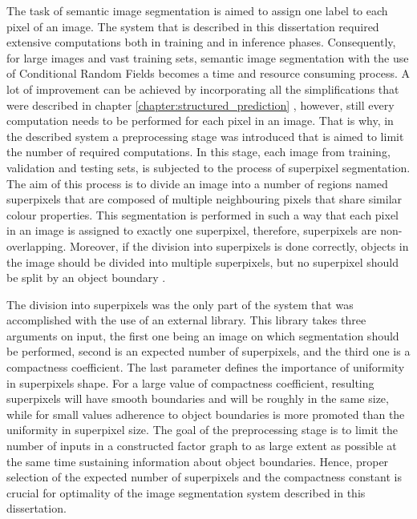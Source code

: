 The task of semantic image segmentation is aimed to assign one label to each pixel of an image. The system that is described in this dissertation required extensive computations both in training and in inference phases. Consequently, for large images and vast training sets, semantic image segmentation with the use of Conditional Random Fields becomes a time and resource consuming process. A lot of improvement can be achieved by incorporating all the simplifications that were described in chapter \ref{chapter:structured_prediction} , however, still every computation needs to be performed for each pixel in an image. That is why, in the described system a preprocessing stage was introduced that is aimed to limit the number of required computations. In this stage, each image from training, validation and testing sets, is subjected to the process of superpixel segmentation. The aim of this process is to divide an image into a number of regions named superpixels that are composed of multiple neighbouring pixels that share similar colour properties. This segmentation is performed in such a way that each pixel in an image is assigned to exactly one superpixel, therefore, superpixels are non-overlapping. Moreover, if the division into superpixels is done correctly, objects in the image should be divided into multiple superpixels, but no superpixel should be split by an object boundary \cite{superpixels}.

The division into superpixels was the only part of the system that was accomplished with the use of an external library. This library takes three arguments on input, the first one being an image on which segmentation should be performed, second is an expected number of superpixels, and the third one is a compactness coefficient. The last parameter defines the importance of uniformity in superpixels shape. For a large value of compactness coefficient, resulting superpixels will have smooth boundaries and will be roughly in the same size, while for small values adherence to object boundaries is more promoted than the uniformity in superpixel size. The goal of the preprocessing stage is to limit the number of inputs in a constructed factor graph to as large extent as possible at the same time sustaining information about object boundaries. Hence, proper selection of the expected number of superpixels and the compactness constant is crucial for optimality of the image segmentation system described in this dissertation. 

